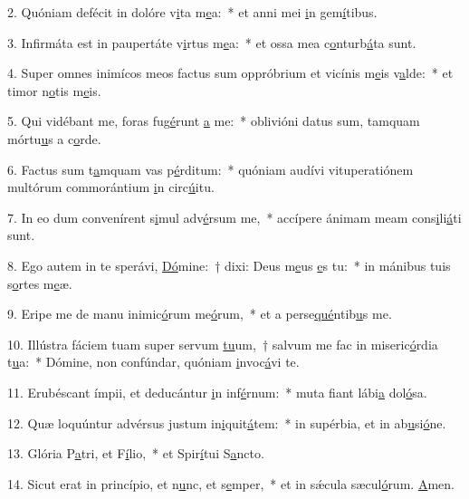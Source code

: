 2. Quóniam defécit in dolóre v\uline{i}ta m\uline{e}a:~* et anni mei \uline{i}n gem\uline{í}tibus.\par 
3. Infirmáta est in paupertáte v\uline{i}rtus m\uline{e}a:~* et ossa mea c\uline{o}nturb\uline{á}ta sunt.\par 
4. Super omnes inimícos meos factus sum oppróbrium et vicínis m\uline{e}is v\uline{a}lde:~* et timor n\uline{o}tis m\uline{e}is.\par 
5. Qui vidébant me, foras fug\uline{é}runt \uline{a} me:~* oblivióni datus sum, tamquam mórtu\uline{u}s a c\uline{o}rde.\par 
6. Factus sum t\uline{a}mquam vas p\uline{é}rditum:~* quóniam audívi vituperatiónem multórum commorántium \uline{i}n circ\uline{ú}itu.\par 
7. In eo dum convenírent s\uline{i}mul adv\uline{é}rsum me,~* accípere ánimam meam cons\uline{i}li\uline{á}ti sunt.\par 
8. Ego autem in te sperávi, \uline{Dó}mine:~† dixi: Deus m\uline{e}us \uline{e}s tu:~* in mánibus tuis s\uline{o}rtes m\uline{e}æ.\par 
9. Eripe me de manu inimic\uline{ó}rum me\uline{ó}rum,~* et a perse\uline{qué}ntib\uline{u}s me.\par 
10. Illústra fáciem tuam super servum \uline{tu}um,~† salvum me fac in miseric\uline{ó}rdia t\uline{u}a:~* Dómine, non confúndar, quóniam \uline{i}nvoc\uline{á}vi te.\par 
11. Erubéscant ímpii, et deducántur \uline{i}n inf\uline{é}rnum:~* muta fiant lábi\uline{a} dol\uline{ó}sa.\par 
12. Quæ loquúntur advérsus justum in\uline{i}quit\uline{á}tem:~* in supérbia, et in ab\uline{u}si\uline{ó}ne.\par 
13. Glória P\uline{a}tri, et F\uline{í}lio,~* et Spir\uline{í}tui S\uline{a}ncto.\par 
14. Sicut erat in princípio, et n\uline{u}nc, et s\uline{e}mper,~* et in sǽcula sæcul\uline{ó}rum. \uline{A}men.\par 
